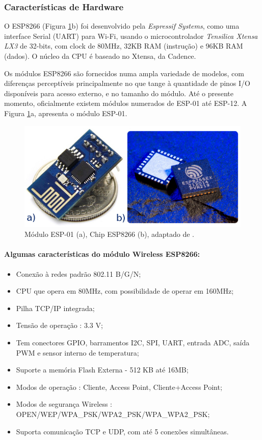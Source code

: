\subsubsection{Características de Hardware}

O ESP8266 (Figura \ref{fig:esp8266}b) foi desenvolvido pela \emph{Espressif
Systems}, como uma interface Serial (UART) para Wi-Fi, usando o microcontrolador
\emph{Tensilica Xtensa LX3} de 32-bits, com clock de 80MHz, 32KB RAM
(instrução) e 96KB RAM (dados). O núcleo da CPU é baseado no Xtensa\cite{esp8266:cadence},
da Cadence.

Os módulos ESP8266 são fornecidos numa ampla variedade de modelos,
com diferenças perceptíveis principalmente no que tange à quantidade
de pinos I/O disponíveis para acesso externo, e no tamanho do módulo.
Até o presente momento, \textquotedbl{}oficialmente\textquotedbl{}
existem módulos numerados de ESP-01 até ESP-12\cite{esp8266:modules}.
A Figura \ref{fig:esp8266}a, apresenta o módulo ESP-01.

\begin{figure}[h]
\begin{centering}
\includegraphics[width=0.8\linewidth]{Imagens/Cap_2/esp8266}
\par\end{centering}
\caption[Placa ESP8266]{Módulo ESP-01 (a), Chip ESP8266 (b), adaptado de \cite{url:esp8266:espressif}.
\label{fig:esp8266}}
\end{figure}


\paragraph*{Algumas características do módulo Wireless ESP8266:}
\begin{itemize}
\item Conexão à redes padrão 802.11 B/G/N;
\item CPU que opera em 80MHz, com possibilidade de operar em 160MHz;
\item Pilha TCP/IP integrada;
\item Tensão de operação : 3.3 V;
\item Tem conectores GPIO, barramentos I2C, SPI, UART, entrada ADC, saída
PWM e sensor interno de temperatura;
\item Suporte a memória Flash Externa - 512 KB até 16MB;
\item Modos de operação : Cliente, Access Point, Cliente+Access Point;
\item Modos de segurança Wireless : OPEN/WEP/WPA\_PSK/WPA2\_PSK/WPA\_WPA2\_PSK;
\item Suporta comunicação TCP e UDP, com até 5 conexões simultâneas.
\end{itemize}

